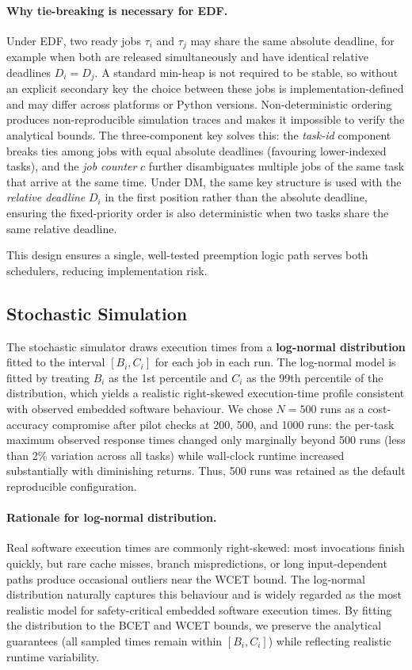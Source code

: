 \documentclass[12pt,a4paper]{article}
\begin{document}
\paragraph{Why tie-breaking is necessary for EDF.}
Under EDF, two ready jobs \(\tau_i\) and \(\tau_j\) may share the same absolute deadline, for example when both are released simultaneously and have identical relative deadlines \(D_i = D_j\). A standard min-heap is not required to be stable, so without an explicit secondary key the choice between these jobs is implementation-defined and may differ across platforms or Python versions. Non-deterministic ordering produces non-reproducible simulation traces and makes it impossible to verify the analytical bounds. The three-component key solves this: the \emph{task-id} component breaks ties among jobs with equal absolute deadlines (favouring lower-indexed tasks), and the \emph{job counter} \(c\) further disambiguates multiple jobs of the same task that arrive at the same time. Under DM, the same key structure is used with the \emph{relative deadline} \(D_i\) in the first position rather than the absolute deadline, ensuring the fixed-priority order is also deterministic when two tasks share the same relative deadline.

This design ensures a single, well-tested preemption logic path serves both schedulers, reducing implementation risk.

\subsection{Stochastic Simulation}

The stochastic simulator draws execution times from a \textbf{log-normal distribution} fitted to the interval \([B_i, C_i]\) for each job in each run. The log-normal model is fitted by treating \(B_i\) as the 1st percentile and \(C_i\) as the 99th percentile of the distribution, which yields a realistic right-skewed execution-time profile consistent with observed embedded software behaviour. We chose \(N = 500\) runs as a cost-accuracy compromise after pilot checks at 200, 500, and 1000 runs: the per-task maximum observed response times changed only marginally beyond 500 runs (less than 2\% variation across all tasks) while wall-clock runtime increased substantially with diminishing returns. Thus, 500 runs was retained as the default reproducible configuration.

\paragraph{Rationale for log-normal distribution.}
Real software execution times are commonly right-skewed: most invocations finish quickly, but rare cache misses, branch mispredictions, or long input-dependent paths produce occasional outliers near the WCET bound. The log-normal distribution naturally captures this behaviour and is widely regarded as the most realistic model for safety-critical embedded software execution times. By fitting the distribution to the BCET and WCET bounds, we preserve the analytical guarantees (all sampled times remain within \([B_i, C_i]\)) while reflecting realistic runtime variability.
\end{document}

